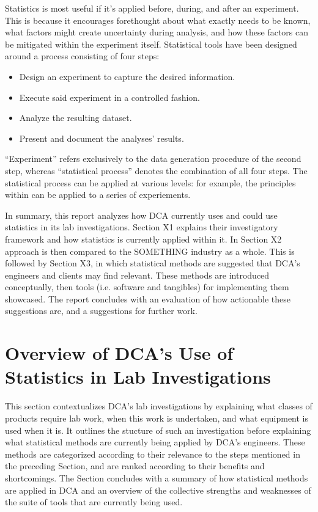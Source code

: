 \documentclass[11pt,a4paper,article]{memoir} %
\begin{document}
\par
Statistics is most useful if it's applied before, during, and after an experiment. This is because it encourages forethought about what exactly needs to be known, what factors might create uncertainty during analysis, and how these factors can be mitigated within the experiment itself. Statistical tools have been designed around a process consisting of four steps:
\begin{itemize}
\item Design an experiment to capture the desired information.
\item Execute said experiment in a controlled fashion.
\item Analyze the resulting dataset.
\item Present and document the analyses' results.
\end{itemize}
``Experiment'' refers exclusively to the data generation procedure of the second step, whereas ``statistical process'' denotes the combination of all four steps.
The statistical process can be applied at various levels: for example, the principles within can be applied to a series of experiements.
\par
In summary, this report analyzes how DCA currently uses and could use statistics in its lab investigations. Section X1 explains their investigatory framework and how statistics is currently applied within it. In Section X2 approach is then compared to the SOMETHING industry as a whole. This is followed by Section X3, in which statistical methods are suggested that DCA's engineers and clients may find relevant. These methods are introduced conceptually, then tools (i.e. software and tangibles) for implementing them showcased. The report concludes with an evaluation of how actionable these suggestions are, and a suggestions for further work.

\newpage



\chapter {Overview of DCA's Use of Statistics in Lab Investigations}
This section contextualizes DCA's lab investigations by explaining what classes of products require lab work, when this work is undertaken, and what equipment is used when it is. It outlines the stucture of such an investigation before explaining what statistical methods are currently being applied by DCA's engineers. These methods are categorized according to their relevance to the steps mentioned in the preceding Section, and are ranked according to their benefits and shortcomings. The Section concludes with a summary of how statistical methods are applied in DCA and an overview of the collective strengths and weaknesses of the suite of tools that are currently being used.
\end{document}
